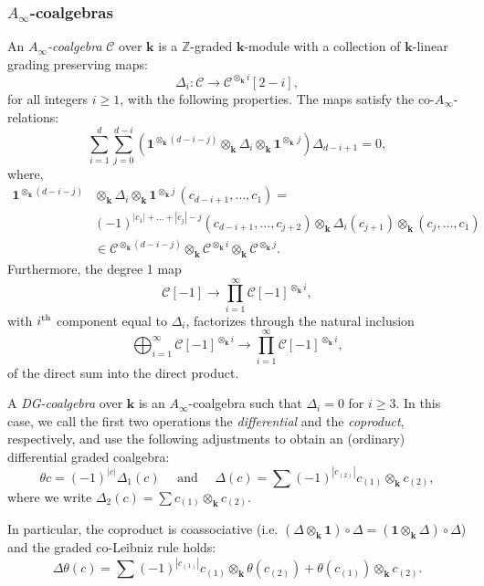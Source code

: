 \documentclass{gtpart}
\renewcommand{\k}{\mathbf{k}}
\renewcommand{\C}{\mathscr{C}}
\renewcommand{\Z}{\mathbb{Z}}
\newcommand{\id}{\mathbf{1}}
\begin{document}
\subsubsection{$A_{\infty}$-coalgebras}\label{ssec:Ainftycoalg}
An \emph{$A_\infty$-coalgebra} $\C$ over $\k$ is a $\Z$-graded $\k$-module with a collection of
$\k$-linear grading preserving maps:
\[ 
\Delta_i\colon \C \to \C^{\otimes_\k i}[2-i],
\]
for all integers $i \geq 1$, with the following properties. The maps satisfy the co-$A_\infty$-relations:
\begin{equation} \label{coainf} 
\sum_{i=1}^d \sum_{j=0}^{d-i} ( \id^{\otimes_\k (d-i-j)} \otimes_\k \Delta_i \otimes_\k
\id^{\otimes_\k\, j} ) \Delta_{d-i+1} = 0, 
\end{equation}
where,  
\begin{align*} 
    \id^{\otimes_\k (d-i-j)}&\otimes_\k \Delta_i\otimes_\k \id^{\otimes_\k j}\,(c_{d-i+1},\ldots, c_{1}) =\\
    &(-1)^{|c_{1}| +\ldots+ |c_{j}|-j} (c_{d-i+1} , \ldots, c_{j+2})\otimes_\k \Delta_i(c_{j+1}) \otimes_\k (c_{j} ,
    \ldots , c_{1})\\
    & \in \C^{\otimes_\k (d-i-j)} \otimes_\k \C^{\otimes_\k i} \otimes_\k
    \C^{\otimes_\k j}. 
\end{align*}
Furthermore, the degree 1 map
\[ 
\C[-1] \to \prod_{i=1}^\infty \C[-1]^{\otimes_\k i}, 
\]
with $i^{\rm th}$ component equal to $\Delta_i$, factorizes through the natural inclusion
\[ 
\bigoplus_{i=1}^\infty \C[-1]^{\otimes_\k i} \to \prod_{i=1}^\infty \C[-1]^{\otimes_\k i}, 
\]
of the direct sum into the direct product.    
    
A \emph{DG-coalgebra} over $\k$ is an $A_\infty$-coalgebra such that $\Delta_i=0$ for $i\geq 3$.
In this case, we call the first two operations the \emph{differential} and the \emph{coproduct},
respectively, and use the following adjustments to obtain an (ordinary) differential
graded coalgebra:
\begin{equation} \label{coleft}  
    \theta c = (-1)^{|c|} \Delta_1(c) \quad \text{ and } \quad \Delta(c) = 
    \sum (-1)^{|c_{(2)}|} c_{(1)} \otimes_\k c_{(2)}, 
\end{equation}
where we write $\Delta_2(c) = \sum c_{(1)} \otimes_\k c_{(2)}$. 

In particular, the coproduct is coassociative (i.e. $(\Delta \otimes_\k \id)\circ \Delta = (\id
\otimes_\k \Delta) \circ \Delta$) and the graded co-Leibniz rule holds:
\begin{equation} \label{coLeib}
\Delta \theta(c) = \sum (-1)^{|c_{(1)}|} c_{(1)} \otimes_{\k} \theta(c_{(2)}) + \theta(c_{(1)})
\otimes_\k c_{(2)}. 
\end{equation}
\end{document}
